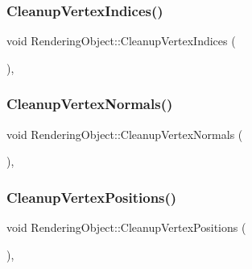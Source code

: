 \hypertarget{class_rendering_object_ac60c8a7f3d5678fd4aa8198f6c980e6e}{}\label{class_rendering_object_ac60c8a7f3d5678fd4aa8198f6c980e6e}
\subsubsection{\texorpdfstring{Cleanup\+Vertex\+Indices()}{CleanupVertexIndices()}}
{\footnotesize\ttfamily void Rendering\+Object\+::\+Cleanup\+Vertex\+Indices (\begin{DoxyParamCaption}{ }\end{DoxyParamCaption})\hspace{0.3cm}{\ttfamily [protected]}, {\ttfamily [virtual]}}

\hypertarget{class_rendering_object_ad89bc24893f8fe32794f0686c2bb0da1}{}\label{class_rendering_object_ad89bc24893f8fe32794f0686c2bb0da1}
\subsubsection{\texorpdfstring{Cleanup\+Vertex\+Normals()}{CleanupVertexNormals()}}
{\footnotesize\ttfamily void Rendering\+Object\+::\+Cleanup\+Vertex\+Normals (\begin{DoxyParamCaption}{ }\end{DoxyParamCaption})\hspace{0.3cm}{\ttfamily [protected]}, {\ttfamily [virtual]}}

\hypertarget{class_rendering_object_af9c1a07398071cdd0cca3ad36095fc85}{}\label{class_rendering_object_af9c1a07398071cdd0cca3ad36095fc85}
\subsubsection{\texorpdfstring{Cleanup\+Vertex\+Positions()}{CleanupVertexPositions()}}
{\footnotesize\ttfamily void Rendering\+Object\+::\+Cleanup\+Vertex\+Positions (\begin{DoxyParamCaption}{ }\end{DoxyParamCaption})\hspace{0.3cm}{\ttfamily [protected]}, {\ttfamily [virtual]}}

